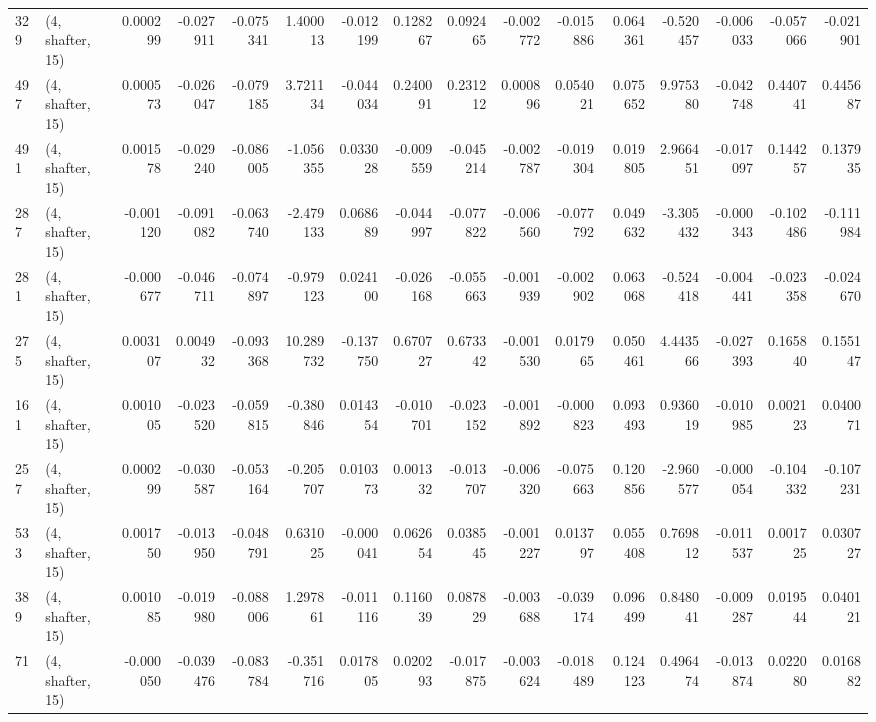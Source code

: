 \begin{tabular}{llrrrrrrrrrrrrrr}
329 &  (4, shafter, 15) &   0.000299 & -0.027911 & -0.075341 &    1.400013 & -0.012199 &   0.128267 &   0.092465 & -0.002772 & -0.015886 &  0.064361 &   -0.520457 & -0.006033 &  -0.057066 &  -0.021901 \\
497 &  (4, shafter, 15) &   0.000573 & -0.026047 & -0.079185 &    3.721134 & -0.044034 &   0.240091 &   0.231212 &  0.000896 &  0.054021 &  0.075652 &    9.975380 & -0.042748 &   0.440741 &   0.445687 \\
491 &  (4, shafter, 15) &   0.001578 & -0.029240 & -0.086005 &   -1.056355 &  0.033028 &  -0.009559 &  -0.045214 & -0.002787 & -0.019304 &  0.019805 &    2.966451 & -0.017097 &   0.144257 &   0.137935 \\
287 &  (4, shafter, 15) &  -0.001120 & -0.091082 & -0.063740 &   -2.479133 &  0.068689 &  -0.044997 &  -0.077822 & -0.006560 & -0.077792 &  0.049632 &   -3.305432 & -0.000343 &  -0.102486 &  -0.111984 \\
281 &  (4, shafter, 15) &  -0.000677 & -0.046711 & -0.074897 &   -0.979123 &  0.024100 &  -0.026168 &  -0.055663 & -0.001939 & -0.002902 &  0.063068 &   -0.524418 & -0.004441 &  -0.023358 &  -0.024670 \\
275 &  (4, shafter, 15) &   0.003107 &  0.004932 & -0.093368 &   10.289732 & -0.137750 &   0.670727 &   0.673342 & -0.001530 &  0.017965 &  0.050461 &    4.443566 & -0.027393 &   0.165840 &   0.155147 \\
161 &  (4, shafter, 15) &   0.001005 & -0.023520 & -0.059815 &   -0.380846 &  0.014354 &  -0.010701 &  -0.023152 & -0.001892 & -0.000823 &  0.093493 &    0.936019 & -0.010985 &   0.002123 &   0.040071 \\
257 &  (4, shafter, 15) &   0.000299 & -0.030587 & -0.053164 &   -0.205707 &  0.010373 &   0.001332 &  -0.013707 & -0.006320 & -0.075663 &  0.120856 &   -2.960577 & -0.000054 &  -0.104332 &  -0.107231 \\
533 &  (4, shafter, 15) &   0.001750 & -0.013950 & -0.048791 &    0.631025 & -0.000041 &   0.062654 &   0.038545 & -0.001227 &  0.013797 &  0.055408 &    0.769812 & -0.011537 &   0.001725 &   0.030727 \\
389 &  (4, shafter, 15) &   0.001085 & -0.019980 & -0.088006 &    1.297861 & -0.011116 &   0.116039 &   0.087829 & -0.003688 & -0.039174 &  0.096499 &    0.848041 & -0.009287 &   0.019544 &   0.040121 \\
71  &  (4, shafter, 15) &  -0.000050 & -0.039476 & -0.083784 &   -0.351716 &  0.017805 &   0.020293 &  -0.017875 & -0.003624 & -0.018489 &  0.124123 &    0.496474 & -0.013874 &   0.022080 &   0.016882 \\

\end{tabular}
